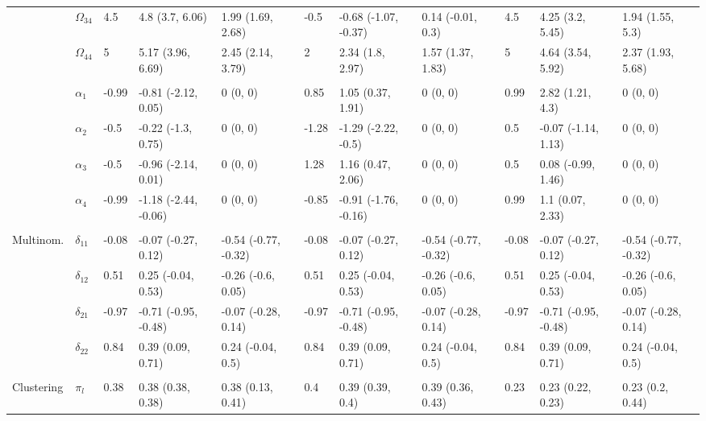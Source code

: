 \documentclass[]{article}
\begin{document}
\begin{landscape}
\begin{table}[t]
\begin{tabular}{lllllllllll}
\hspace{1em} & $\Omega_{34}$ & 4.5 & 4.8 (3.7, 6.06) & 1.99 (1.69, 2.68) & -0.5 & -0.68 (-1.07, -0.37) & 0.14 (-0.01, 0.3) & 4.5 & 4.25 (3.2, 5.45) & 1.94 (1.55, 5.3)\\
\hspace{1em} & $\Omega_{44}$ & 5 & 5.17 (3.96, 6.69) & 2.45 (2.14, 3.79) & 2 & 2.34 (1.8, 2.97) & 1.57 (1.37, 1.83) & 5 & 4.64 (3.54, 5.92) & 2.37 (1.93, 5.68)\\
\addlinespace[0.3em]
\multicolumn{11}{l}{\textbf{ }}\\
\hspace{1em} & $\alpha_{1}$ & -0.99 & -0.81 (-2.12, 0.05) & 0 (0, 0) & 0.85 & 1.05 (0.37, 1.91) & 0 (0, 0) & 0.99 & 2.82 (1.21, 4.3) & 0 (0, 0)\\
\hspace{1em} & $\alpha_{2}$ & -0.5 & -0.22 (-1.3, 0.75) & 0 (0, 0) & -1.28 & -1.29 (-2.22, -0.5) & 0 (0, 0) & 0.5 & -0.07 (-1.14, 1.13) & 0 (0, 0)\\
\hspace{1em} & $\alpha_{3}$ & -0.5 & -0.96 (-2.14, 0.01) & 0 (0, 0) & 1.28 & 1.16 (0.47, 2.06) & 0 (0, 0) & 0.5 & 0.08 (-0.99, 1.46) & 0 (0, 0)\\
\hspace{1em} & $\alpha_{4}$ & -0.99 & -1.18 (-2.44, -0.06) & 0 (0, 0) & -0.85 & -0.91 (-1.76, -0.16) & 0 (0, 0) & 0.99 & 1.1 (0.07, 2.33) & 0 (0, 0)\\
\addlinespace[0.3em]
\multicolumn{11}{l}{\textbf{ }}\\
\hspace{1em}Multinom. & $\delta_{11}$ & -0.08 & -0.07 (-0.27, 0.12) & -0.54 (-0.77, -0.32) & -0.08 & -0.07 (-0.27, 0.12) & -0.54 (-0.77, -0.32) & -0.08 & -0.07 (-0.27, 0.12) & -0.54 (-0.77, -0.32)\\
\hspace{1em} & $\delta_{12}$ & 0.51 & 0.25 (-0.04, 0.53) & -0.26 (-0.6, 0.05) & 0.51 & 0.25 (-0.04, 0.53) & -0.26 (-0.6, 0.05) & 0.51 & 0.25 (-0.04, 0.53) & -0.26 (-0.6, 0.05)\\
\hspace{1em} & $\delta_{21}$ & -0.97 & -0.71 (-0.95, -0.48) & -0.07 (-0.28, 0.14) & -0.97 & -0.71 (-0.95, -0.48) & -0.07 (-0.28, 0.14) & -0.97 & -0.71 (-0.95, -0.48) & -0.07 (-0.28, 0.14)\\
\hspace{1em} & $\delta_{22}$ & 0.84 & 0.39 (0.09, 0.71) & 0.24 (-0.04, 0.5) & 0.84 & 0.39 (0.09, 0.71) & 0.24 (-0.04, 0.5) & 0.84 & 0.39 (0.09, 0.71) & 0.24 (-0.04, 0.5)\\
\addlinespace[0.3em]
\multicolumn{11}{l}{\textbf{ }}\\
\hspace{1em}Clustering & $\pi_l$ & 0.38 & 0.38 (0.38, 0.38) & 0.38 (0.13, 0.41) & 0.4 & 0.39 (0.39, 0.4) & 0.39 (0.36, 0.43) & 0.23 & 0.23 (0.22, 0.23) & 0.23 (0.2, 0.44)\\
\bottomrule
\end{tabular}
\end{table}
\end{landscape}
\end{document}
